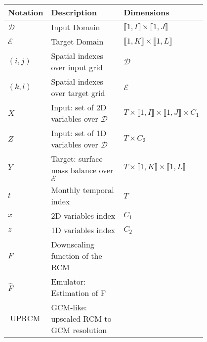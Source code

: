 \begin{table}[!tbp]
    \centering
    \caption{}
    \renewcommand\arraystretch{1.5}
    \begin{tabular}{l>{\raggedright\arraybackslash}p{0.4\linewidth}>{\raggedright\arraybackslash}p{0.4\linewidth}}
    \toprule
        \textbf{Notation} & \textbf{Description} & \textbf{Dimensions} \\ \toprule 
        $\mathcal{D}$ & Input Domain & $\llbracket 1, I \rrbracket \times \llbracket 1, J \rrbracket$   \\
        $\mathcal{E}$ & Target Domain & $\llbracket 1, K \rrbracket \times \llbracket 1, L \rrbracket$   \\
        $(i,j)$ & Spatial indexes over
        input grid & $\mathcal{D}$   \\
        $(k,l)$ & Spatial indexes over
        target grid & $\mathcal{E}$   \\
        $X$ & Input: set of 2D variables over $\mathcal{D}$ & $T \times \llbracket 1, I \rrbracket \times \llbracket 1, J \rrbracket \times C_1$   \\
        $Z$ & Input: set of 1D variables over $\mathcal{D}$ & $T \times C_2$   \\
        $Y$ & Target: surface mass balance over $\mathcal{E}$ & $T \times \llbracket 1, K \rrbracket \times \llbracket 1, L \rrbracket$  \\
        $t$ & Monthly temporal index & $T$   \\
        $x$ & 2D variables index & $C_1$   \\
        $z$ & 1D variables index & $C_2$ 
        \\
        $F$ & Downscaling function of the RCM & 
        \\
        $\hat{F}$ & Emulator: Estimation of F & 
        \\
        $\operatorname{UPRCM}$ & GCM-like: upscaled RCM to GCM resolution & 
        \\
\bottomrule
    \end{tabular}
            \label{tab:notations}
\end{table}